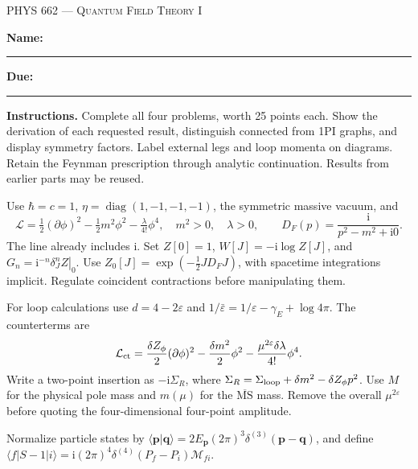 \documentclass[11pt]{article}
\newcommand{\ii}{\mathrm i}
\newcommand{\eps}{\varepsilon}
\newcommand{\diag}{\operatorname{diag}}
\newcommand{\Lag}{\mathcal L}
\newcommand{\MSbar}{\overline{\mathrm{MS}}}
\begin{document}
\begin{center}
{\scshape\Large PHYS 662 --- Quantum Field Theory I\par}
\vspace{0.3em}{\large Interactions and Scalar Theory at One Loop\par}
\vspace{0.3em}{\large Lectures 21--22 \quad Fall 2026\par}
\end{center}\medskip
\textbf{Name:} \rule{0.43\textwidth}{0.4pt}\hfill
\textbf{Due:} \rule{0.24\textwidth}{0.4pt}

\textbf{Instructions.} Complete all four problems, worth 25 points each.
Show the derivation of each requested result, distinguish connected
from 1PI graphs, and display symmetry factors. Label external legs
and loop momenta on diagrams. Retain the Feynman prescription through
analytic continuation. Results from earlier parts may be reused.

\begin{keyidea}
Use \(\hbar=c=1\), \(\eta=\diag(1,-1,-1,-1)\), the symmetric massive
vacuum, and
\[
 \Lag=\tfrac12(\partial\phi)^2-\tfrac12m^2\phi^2-\tfrac{\lambda}{4!}\phi^4,
 \quad m^2>0,\quad\lambda>0,\qquad
 D_F(p)=\frac{\ii}{p^2-m^2+\ii0}.
\]
The line already includes \(\ii\). Set \(Z[0]=1\),
\(W[J]=-\ii\log Z[J]\), and
\(G_n=\left.\ii^{-n}\delta_J^n Z\right|_0\).
Use \(Z_0[J]=\exp(-\tfrac12 JD_FJ)\), with spacetime integrations
implicit. Regulate coincident contractions before manipulating them.

For loop calculations use \(d=4-2\eps\) and
\(1/\bar\eps=1/\eps-\gamma_E+\log4\pi\). The counterterms are
\[
 \Lag_{\rm ct}=\frac{\delta Z_\phi}{2}(\partial\phi)^2
 -\frac{\delta m^2}{2}\phi^2
 -\frac{\mu^{2\eps}\delta\lambda}{4!}\phi^4.
\]
Write a two-point insertion as \(-\ii\Sigma_R\), where
\(\Sigma_R=\Sigma_{\rm loop}+\delta m^2-\delta Z_\phi p^2\).
Use \(M\) for the physical pole mass and \(m(\mu)\) for the
\(\MSbar\) mass. Remove the overall \(\mu^{2\eps}\) before quoting
the four-dimensional four-point amplitude.

Normalize particle states by
\(\langle\bm p|\bm q\rangle=2E_{\bm p}(2\pi)^3\delta^{(3)}(\bm p-\bm q)\),
and define \(\langle f|S-1|i\rangle=\ii(2\pi)^4
\delta^{(4)}(P_f-P_i)\mathcal M_{fi}\).
\end{keyidea}
\end{document}
